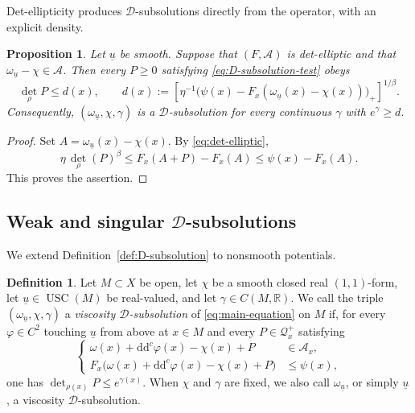 \documentclass[oneside,english,letterpaper]{amsart}
\numberwithin{equation}{section}
\theoremstyle{plain}
\newtheorem{prop}[thm]{Proposition}
\theoremstyle{definition}
\newtheorem{defn}[thm]{Definition}
\theoremstyle{remark}
\renewcommand{\d}{\mathrm{d}}
\newcommand{\ddc}{\d\d^c}
\begin{document}
Det-ellipticity produces $\mathcal D$-subsolutions directly from
the operator, with an explicit density.
\begin{prop}
	\label{prop:det-elliptic-D-subsolution}
	Let $\underline u$ be smooth. Suppose that $(F,\mathcal A)$ is
	det-elliptic and that $\omega_{\underline u}-\chi\in\mathcal A$. Then every $P\geq0$ satisfying
	\eqref{eq:D-subsolution-test} obeys
	$$
	\det_\rho P\leq d(x),
	\qquad
	d(x):=\left[
	\eta^{-1}\bigl(\psi(x)-F_x(\omega_{\underline u}(x)-\chi(x))\bigr)_+
	\right]^{1/\beta}.
	$$
	Consequently, $(\omega_{\underline u},\chi,\gamma)$ is a
	$\mathcal D$-subsolution for every continuous $\gamma$ with
	$e^\gamma\geq d$.
\end{prop}

\begin{proof}
	Set $A=\omega_{\underline u}(x)-\chi(x)$. By \eqref{eq:det-elliptic},
	$$
	\eta\,\det_\rho(P)^\beta
	\leq F_x(A+P)-F_x(A)
	\leq\psi(x)-F_x(A).
	$$
	This proves the assertion.
\end{proof}





\subsection{Weak and singular \texorpdfstring{$\mathcal D$}{D}-subsolutions}
\label{subsec:weak-D-subsolutions}

We extend Definition~\ref{def:D-subsolution} to nonsmooth
potentials.

\begin{defn}
	\label{def:viscosity-D-subsolution}
	Let $M\subset X$ be open, let  $\chi$ be a smooth closed real $(1, 1)$-form, let $\underline u\in\operatorname{USC}(M)$
	be real-valued, and let $\gamma\in C(M,\mathbb R)$. We call the triple
	$(\omega_{\underline u},\chi,\gamma)$ a \emph{viscosity
		$\mathcal D$-subsolution} of \eqref{eq:main-equation} on $M$ if,
	for every $\varphi\in C^2$ touching $\underline u$ from above at
	$x\in M$ and every $P\in\mathcal Q_x^+$ satisfying
	\begin{equation}
		\label{eq:viscosity-D-test}
		\left\{
		\begin{aligned}
			\omega(x)+\ddc\varphi(x)-\chi(x)+P&\in\mathcal A_x,\\
			F_x\bigl(\omega(x)+\ddc\varphi(x)-\chi(x)+P\bigr)&\leq\psi(x),
		\end{aligned}
		\right.
	\end{equation}
	one has $\det_{\rho(x)}P\leq e^{\gamma(x)}$.
	When $\chi$ and $\gamma$ are fixed, we also call
	$\omega_{\underline u}$, or simply $\underline u$, a viscosity
	$\mathcal D$-subsolution.
\end{defn}
\end{document}
